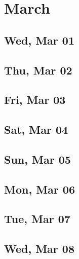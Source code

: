\chapter{March}
	\section{Wed, Mar 01}
		
		
	\section{Thu, Mar 02}
		
		
	\section{Fri, Mar 03}
		
		
	\section{Sat, Mar 04}
		
		
	\section{Sun, Mar 05}
		
		
	\section{Mon, Mar 06}
		
		
	\section{Tue, Mar 07}
		
		
	\section{Wed, Mar 08}
		
		
